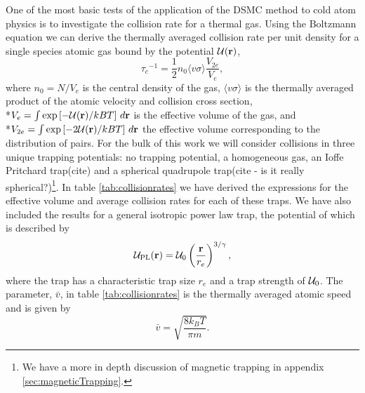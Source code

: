 One of the most basic tests of the application of the DSMC method to cold atom physics is to investigate the collision rate for a thermal gas.
Using the Boltzmann equation we can derive \cite{Walraven2010} the thermally averaged collision rate per unit density for a single species atomic gas bound by the potential ${\cal U}(\mathbf{r})$,
\begin{equation}
    {\tau_c}^{-1} = \frac{1}{2} n_{0}\langle v\sigma \rangle \frac{V_{2e}}{V_e},
\end{equation}
where $n_0 = N / V_e$ is the central density of the gas, $\langle v\sigma \rangle$ is the thermally averaged product of the atomic velocity and collision cross section, \\*$V_e = \int \exp\left[-{\cal U}(\mathbf{r})/kBT\right]\, d\mathbf{r}$ is the effective volume of the gas, and \\*$V_{2e} = \int \exp\left[-2{\cal U}(\mathbf{r})/kBT\right]\, d\mathbf{r}$ the effective volume corresponding to the distribution of pairs.
For the bulk of this work we will consider collisions in three unique trapping potentials: no trapping potential, \ie  a homogeneous gas, an Ioffe Pritchard trap(cite) and a spherical quadrupole trap(cite - is it really spherical?)\footnote{We have a more in depth discussion of magnetic trapping in appendix \ref{sec:magneticTrapping}.}. 
In table \ref{tab:collisionrates} we have derived the expressions for the effective volume and average collision rates for each of these traps. We have also included the results for a general isotropic power law trap, the potential of which is described by
\begin{equation}
    {\cal U}_{\mathrm{PL}}(\mathbf{r}) = {\cal U}_0 \left(\frac{\mathbf{r}}{r_e}\right)^{3/\gamma}, \label{eq:powerlaw}
\end{equation}
where the trap has a characteristic trap size $r_e$ and a trap strength of ${\cal U}_0$. The parameter, $\bar{v}$, in table \ref{tab:collisionrates} is the thermally averaged atomic speed and is given by
\begin{equation*}
    \bar{v} = \sqrt{\frac{8 k_B T}{\pi m}}.
\end{equation*}

